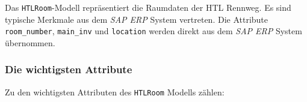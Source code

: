 Das \texttt{HTLRoom}-Modell repräsentiert die Raumdaten der HTL Rennweg.
Es sind typische Merkmale aus dem \emph{SAP ERP}
System vertreten. Die Attribute \texttt{room\_number},
\texttt{main\_inv} und \texttt{location} werden direkt aus dem
\emph{SAP ERP}
System übernommen.

\hypertarget{die-wichtigsten-attribute-1}{%
\subsubsection{Die wichtigsten
Attribute}\label{die-wichtigsten-attribute-1}}

Zu den wichtigsten Attributen des \texttt{HTLRoom} Modells zählen:

